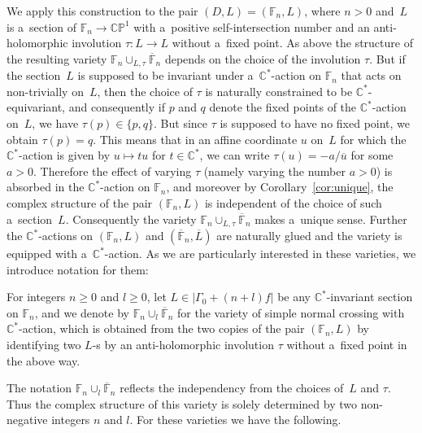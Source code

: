 We apply this construction to the pair $(D,L) = (\mathbb{F}_n,L)$, where $n > 0$ and~$L$ is a~section of
$\mathbb{F}_n\to \mathbb{CP}^1$ with a~positive self-intersection number and an anti-holomorphic involution $\tau:L\to L$ without a~f\/ixed point.
As above the structure of the resulting variety $\mathbb{F}_n\cup_{L,\tau}\overline{\mathbb{F}}_n$ depends on the choice
of the involution $\tau$.
But if the section~$L$ is supposed to be invariant under a~$\mathbb{C}^*$-action on $\mathbb{F}_n$ that acts on
non-trivially on~$L$, then the choice of $\tau$ is naturally constrained to be $\mathbb{C}^*$-equivariant, and
consequently if $p$ and $q$ denote the f\/ixed points of the $\mathbb{C}^*$-action on~$L$, we have $\tau(p)\in\{p,q\}$.
But since $\tau$ is supposed to have no f\/ixed point, we obtain $\tau(p) = q$.
This means that in an af\/f\/ine coordinate $u$ on~$L$ for which the $\mathbb{C}^*$-action is given by $u\mapsto tu$ for
$t\in\mathbb{C}^*$, we can write $\tau(u) = -a/\overline u$ for some $a>0$.
Therefore the ef\/fect of varying $\tau$ (namely varying the number $a>0$) is absorbed in the $\mathbb{C}^*$-action on
$\mathbb{F}_n$, and moreover by Corollary~\ref{cor:unique}, the complex structure of the pair $(\mathbb{F}_n,L)$ is
independent of the choice of such a~section~$L$.
Consequently the variety $\mathbb{F}_n\cup_{L,\tau}\overline{\mathbb{F}}_n$ makes a~unique sense.
Further the $\mathbb{C}^*$-actions on $(\mathbb{F}_n,L)$ and $(\overline{\mathbb{F}}_n,\overline L)$ are naturally glued
and the variety is equipped with a~$\mathbb{C}^*$-action.
As we are particularly interested in these varieties, we introduce notation for them:

\begin{Definition}
\label{def:scn}
For integers $n \ge 0$ and $l\ge 0$, let $L\in |\Gamma_0 + (n+l)f|$ be any $\mathbb{C}^*$-invariant section on
$\mathbb{F}_n$, and we denote by $\mathbb{F}_n\cup_l\overline{\mathbb{F}}_n$ for the variety of simple normal crossing
with $\mathbb{C}^*$-action, which is obtained from the two copies of the pair $(\mathbb{F}_n,L)$ by identifying two
$L$-s by an anti-holomorphic involution $\tau$ without a~f\/ixed point in the above way.
\end{Definition}

The notation $\mathbb{F}_n\cup_l\overline{\mathbb{F}}_n$ ref\/lects the independency from the choices of~$L$ and $\tau$.
Thus the complex structure of this variety is solely determined by two non-negative integers $n$ and $l$.
For these varieties we have the following.

